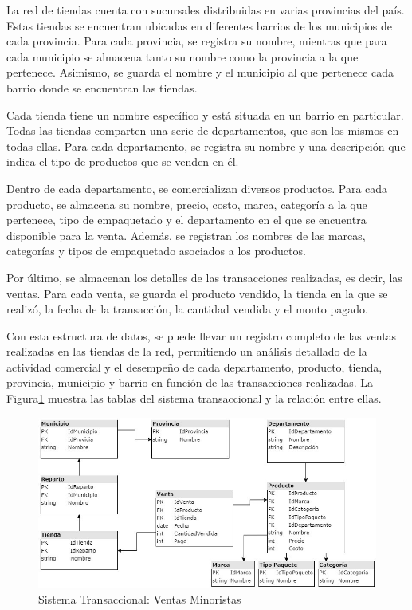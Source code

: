 La red de tiendas cuenta con sucursales distribuidas en varias provincias del país. Estas tiendas se encuentran ubicadas 
en diferentes barrios de los municipios de cada provincia. Para cada provincia, se registra su nombre, mientras que para 
cada municipio se almacena tanto su nombre como la provincia a la que pertenece. Asimismo, se guarda el nombre y el 
municipio al que pertenece cada barrio donde se encuentran las tiendas.

Cada tienda tiene un nombre específico y está situada en un barrio en particular. Todas las tiendas comparten una serie 
de departamentos, que son los mismos en todas ellas. Para cada departamento, se registra su nombre y una descripción que 
indica el tipo de productos que se venden en él.

Dentro de cada departamento, se comercializan diversos productos. Para cada producto, se almacena su nombre, precio, costo, 
marca, categoría a la que pertenece, tipo de empaquetado y el departamento en el que se encuentra disponible para la venta. 
Además, se registran los nombres de las marcas, categorías y tipos de empaquetado asociados a los productos.

Por último, se almacenan los detalles de las transacciones realizadas, es decir, las ventas. Para cada venta, se guarda 
el producto vendido, la tienda en la que se realizó, la fecha de la transacción, la cantidad vendida y el monto pagado.

Con esta estructura de datos, se puede llevar un registro completo de las ventas realizadas en las tiendas de la red, 
permitiendo un análisis detallado de la actividad comercial y el desempeño de cada departamento, producto, tienda, 
provincia, municipio y barrio en función de las transacciones realizadas. La Figura\ref{fig:retail-transactional}
muestra las tablas del sistema transaccional y la relación entre ellas.

\begin{figure}[ht]
    \centering
    \includegraphics[scale=0.7]{../document/Graphics/retailSales-Transactional.jpg}
    \caption{Sistema Transaccional: Ventas Minoristas}
    \label{fig:retail-transactional}
  \end{figure}

